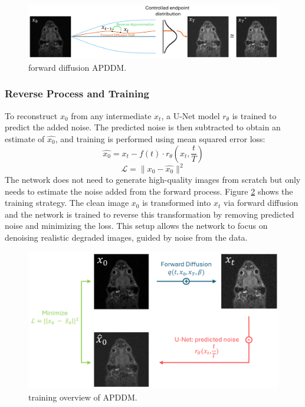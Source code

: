 \documentclass[twocolumn]{article}
\begin{document}
\begin{figure}[H]
    \centering
    \includegraphics[width=1\linewidth]{forward APDDM.png}
    \caption{forward diffusion APDDM.}
    \label{fig:forward APDDM}
\end{figure}

\subsubsection{Reverse Process and Training}
To reconstruct $x_0$ from any intermediate $x_t$, a U-Net model $r_{\theta}$ is trained to predict the added noise. 
The predicted noise is then subtracted to obtain an estimate of $\hat{x_0}$, and training is performed using mean squared error loss: 
\begin{equation}\label{eq:Markov chain}
    \hat{x_0}=x_t-f(t) \cdot r_{\theta}(x_t,\frac{t}{T})
\end{equation}
\begin{equation}
    \mathcal{L}=\|x_0-\hat{x_0}\|^2
\end{equation}
The network does not need to generate high-quality images from scratch but only needs to estimate the noise added from the forward process. 
Figure \ref{fig:APDDM} shows the training strategy. The clean image $x_0$ is transformed into $x_t$ via forward diffusion and the network is trained to reverse this transformation by removing predicted noise and minimizing the loss. 
This setup allows the network to focus on denoising realistic degraded images, guided by noise from the data.

\begin{figure}[H]
    \centering
    \includegraphics[width=1\linewidth]{full APDDM .png}
    \caption{training overview of APDDM.}
    \label{fig:APDDM}
\end{figure}
\end{document}
